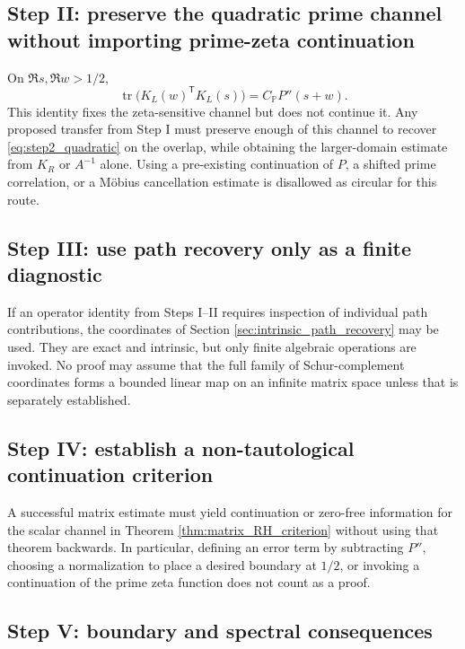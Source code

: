 \documentclass[11pt]{amsart}
\numberwithin{equation}{section}
\theoremstyle{plain}
\theoremstyle{definition}
\theoremstyle{remark}
\newcommand{\tr}{\operatorname{tr}}
\begin{document}
\subsection{Step II: preserve the quadratic prime channel without importing prime-zeta continuation}
\label{subsec:step2}

On $\Re s,\Re w>1/2$,
\begin{equation}
\tr\bigl(K_L(w)^{\mathsf T}K_L(s)\bigr)
=C_{\mathbb P}P''(s+w).
\label{eq:step2_quadratic}
\end{equation}
This identity fixes the zeta-sensitive channel but does not continue it.  Any proposed transfer from Step I must preserve enough of this channel to recover \eqref{eq:step2_quadratic} on the overlap, while obtaining the larger-domain estimate from $K_R$ or $A^{-1}$ alone.  Using a pre-existing continuation of $P$, a shifted prime correlation, or a M\"obius cancellation estimate is disallowed as circular for this route.

\subsection{Step III: use path recovery only as a finite diagnostic}
\label{subsec:step3}

If an operator identity from Steps I--II requires inspection of individual path contributions, the coordinates of Section \ref{sec:intrinsic_path_recovery} may be used.  They are exact and intrinsic, but only finite algebraic operations are invoked.  No proof may assume that the full family of Schur-complement coordinates forms a bounded linear map on an infinite matrix space unless that is separately established.

\subsection{Step IV: establish a non-tautological continuation criterion}
\label{subsec:step4}

A successful matrix estimate must yield continuation or zero-free information for the scalar channel in Theorem \ref{thm:matrix_RH_criterion} without using that theorem backwards.  In particular, defining an error term by subtracting $P''$, choosing a normalization to place a desired boundary at $1/2$, or invoking a continuation of the prime zeta function does not count as a proof.

\subsection{Step V: boundary and spectral consequences}
\label{subsec:step5}
\end{document}
